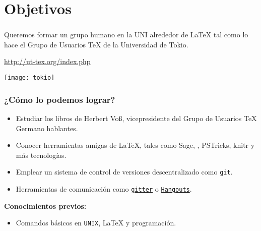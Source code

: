 \section{Objetivos}

\begin{frame}
\frametitle{\insertsection}
Queremos formar un grupo humano en la UNI alrededor de \LaTeX{} tal como lo hace el Grupo de Usuarios \TeX{} de la Universidad de Tokio.

{\centering
\url{http://ut-tex.org/index.php}
\par}

	\begin{center}
	\texttt{[image: tokio]}
	\end{center}
\end{frame}

\begin{frame}[fragile]
\frametitle{¿Cómo lo podemos lograr?}
\begin{itemize}
	\item Estudiar los libros de Herbert Vo\ss, vicepresidente del Grupo de Usuarios \TeX{} Germano hablantes.
	\item Conocer herramientas amigas de \LaTeX{}, tales como Sage, \arara, PSTricks, knitr y más tecnologías.
	\item Emplear un sistema de control de versiones descentralizado como \texttt{git}.
	\item Herramientas de comunicación como \href{https://gitter.im/}{\texttt{gitter}} o \href{https://hangouts.google.com/}{\texttt{Hangouts}}.
\end{itemize}
\textbf{Conocimientos previos:}
\begin{itemize}
	\item Comandos básicos en \texttt{UNIX}, \LaTeX{} y programación.
\end{itemize}
\end{frame}